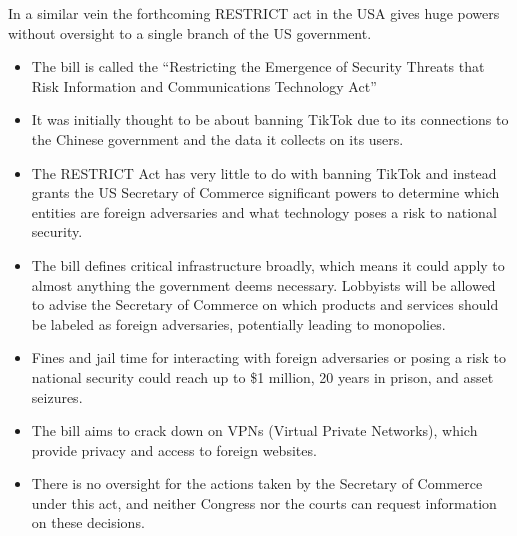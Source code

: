In a similar vein the forthcoming RESTRICT act in the USA gives huge powers without oversight to a single branch of the US government.
\begin{itemize}
\item The bill is called the ``Restricting the Emergence of Security Threats that Risk Information and Communications Technology Act'' 
\item It was initially thought to be about banning TikTok due to its connections to the Chinese government and the data it collects on its users.
\item The RESTRICT Act has very little to do with banning TikTok and instead grants the US Secretary of Commerce significant powers to determine which entities are foreign adversaries and what technology poses a risk to national security.
\item The bill defines critical infrastructure broadly, which means it could apply to almost anything the government deems necessary.
Lobbyists will be allowed to advise the Secretary of Commerce on which products and services should be labeled as foreign adversaries, potentially leading to monopolies.
\item  Fines and jail time for interacting with foreign adversaries or posing a risk to national security could reach up to \$1 million, 20 years in prison, and asset seizures.
\item The bill aims to crack down on VPNs (Virtual Private Networks), which provide privacy and access to foreign websites.
\item There is no oversight for the actions taken by the Secretary of Commerce under this act, and neither Congress nor the courts can request information on these decisions.
\end{itemize}

